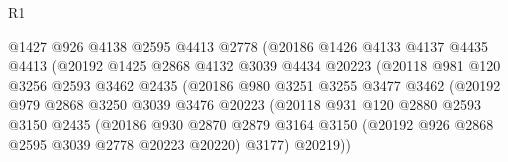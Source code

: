 \begin{lexlean}{R1}
\begin{coremodule}
                                  @1427
                                  @926
                                  @4138
                                  @2595
                                  @4413
                                  @2778
                                  (@20186
                                    @1426
                                    @4133
                                    @4137
                                    @4435
                                    @4413
                                    (@20192
                                      @1425
                                      @2868
                                      @4132
                                      @3039
                                      @4434
                                      @20223
                                      (@20118
                                        @981
                                        @120
                                        @3256
                                        @2593
                                        @3462
                                        @2435
                                        (@20186
                                          @980
                                          @3251
                                          @3255
                                          @3477
                                          @3462
                                          (@20192
                                            @979
                                            @2868
                                            @3250
                                            @3039
                                            @3476
                                            @20223
                                            (@20118
                                              @931
                                              @120
                                              @2880
                                              @2593
                                              @3150
                                              @2435
                                              (@20186
                                                @930
                                                @2870
                                                @2879
                                                @3164
                                                @3150
                                                (@20192 @926 @2868 @2595 @3039 @2778 @20223 @20220)
                                                @3177)
                                              @20219))

\end{coremodule}
\end{lexlean}

